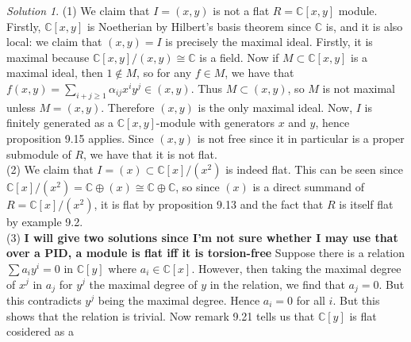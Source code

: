 \documentclass[reqno]{amsart}
\theoremstyle{definition}
\theoremstyle{remark}
\newtheorem*{solution}{Solution}
\begin{document}
    \begin{solution}
        (1) We claim that
        $I = \left( x,y \right) $ is not
        a flat $R = \mathbb{C}\left[ x,y \right] $ module.
        Firstly,
        $\mathbb{C} \left[ x,y \right] $ is Noetherian by
        Hilbert's basis theorem since
        $\mathbb{C}$ is, and
        it is also local: we claim that
        $\left( x,y \right) = I$ is precisely the
        maximal ideal. Firstly,
        it is maximal because
        $\mathbb{C} \left[ x,y \right] / \left( x,y \right)
        \cong \mathbb{C}$ is a field. Now if
        $M \subset \mathbb{C} \left[ x,y \right] $ is a
        maximal ideal, then $1 \not\in M$, so
        for any $f \in M$, we have that
        $f(x,y) =
        \sum_{i+j\ge 1} \alpha_{ij} x^{i} y^{j}
        \in \left( x,y \right) $.
        Thus $M \subset (x,y)$, so
        $M$ is not maximal unless $M = (x,y)$.
        Therefore $(x,y)$ is the only maximal ideal.
        Now, $I$ is finitely generated as
        a $\mathbb{C}\left[ x,y \right] $-module
        with generators
        $x$ and  $y$, hence
        proposition 9.15 applies. Since
        $(x,y)$ is not free since it in particular is a
        proper submodule of $R$, we have that
        it is not flat.\\
        \linebreak
        (2) We claim that
         $I = \left( x \right) \subset
         \mathbb{C} \left[ x \right] / (x^2)$ is indeed
         flat. This can be seen since
         $\mathbb{C} \left[ x \right] / (x^2) =
         \mathbb{C} \oplus (x) \cong
         \mathbb{C} \oplus \mathbb{C}$, so
         since $(x)$ is a direct summand of
         $R = \mathbb{C} \left[ x \right] /(x^2)$,
         it is flat by proposition 9.13 and the fact that
         $R$ is itself flat by example 9.2.\\
         \linebreak
         (3)
         \textbf{I will give two solutions since I'm
         not sure whether I may use that over a PID,
     a module is flat iff it is torsion-free}
     Suppose there
     is a relation
     $\sum a_i y^{i} = 0$ in $\mathbb{C}[y]$ where
     $a_i \in \mathbb{C}[x]$. However,
     then taking the maximal degree of $x^{j}$ in
     $a_j$ for $y^{j}$ the maximal degree
     of $y $ in the relation, we find that
     $a_j = 0$. But this contradicts $y^{j}$ being the
     maximal degree. Hence
     $a_i = 0$ for all $i$. But this
     shows that the relation is trivial. Now
     remark 9.21 tells us that
     $\mathbb{C}[y]$ is flat cosidered as a

\end{solution}
\end{document}
